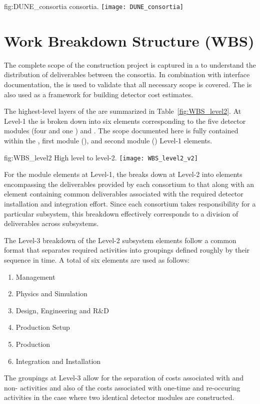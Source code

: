 \begin{dunefigure}{fig:DUNE_consortia}
  { consortia.}
  \texttt{[image: DUNE\_consortia]}
\end{dunefigure}

\section{Work Breakdown Structure (WBS)}
\label{sec:fdsp-coord-wbs}

The complete scope of the  construction project is captured in a 
 to understand the distribution of deliverables between 
the consortia.  In combination with interface documentation, the 
 is used to validate that all necessary scope is covered.  The 
 is also used as a framework for building  
detector cost estimates.

The highest-level layers of the   are summarized 
in Table~\ref{fig:WBS_level2}.  At Level-1 the  is broken down into 
six elements corresponding to the five  detector modules (four 
 and one ) and .  The scope documented
here is fully contained within the , first  module 
(), and second  module () Level-1 elements.   
\begin{dunefigure}{fig:WBS_level2}
  {High level   to level-2.}
  \texttt{[image: WBS\_level2\_v2]}
\end{dunefigure}

For the  module elements at Level-1, the  breaks 
down at Level-2 into elements encompassing the deliverables provided by 
each consortium to that  along with an element containing 
common deliverables associated with the required detector installation 
and integration effort.  Since each consortium takes responsibility 
for a particular subsystem, this breakdown effectively corresponds to 
a division of deliverables across subsystems. 

The Level-3 breakdown of the Level-2 subsystem  elements follow 
a common format that separates required activities into groupings defined 
roughly by their sequence in time.  A total of six elements are used as 
follows:     
\begin{enumerate}
  \item Management
  \item Physics and Simulation
  \item Design, Engineering and R\&D
  \item Production Setup
  \item Production
  \item Integration and Installation
\end{enumerate}
The groupings at Level-3 allow for the separation of costs associated with 
 and non- activities and also of the costs associated with one-time 
and re-occuring activities in the case where two identical detector modules
are constructed.   

